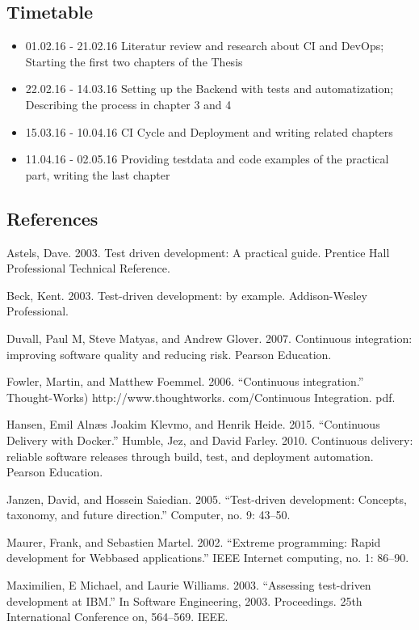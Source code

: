\subsection{Timetable}
\begin{itemize}
  \item 01.02.16 - 21.02.16 Literatur review and research about CI and DevOps; Starting the first two chapters of the Thesis
  \item 22.02.16 - 14.03.16 Setting up the Backend with tests and automatization; Describing the process in chapter 3 and 4
  \item 15.03.16 - 10.04.16 CI Cycle and Deployment and writing related chapters
  \item 11.04.16 - 02.05.16 Providing testdata and code examples of the practical part, writing the last chapter
\end{itemize}

\subsection{References}

Astels, Dave. 2003. Test driven development: A practical guide. Prentice Hall Professional Technical Reference.

Beck, Kent. 2003. Test-driven development: by example. Addison-Wesley Professional.

Duvall, Paul M, Steve Matyas, and Andrew Glover. 2007. Continuous integration: improving software quality and reducing risk. Pearson Education.

Fowler, Martin, and Matthew Foemmel. 2006. “Continuous integration.” Thought-Works) http://www.thoughtworks. com/Continuous Integration. pdf.

Hansen, Emil Alnæs Joakim Klevmo, and Henrik Heide. 2015. “Continuous Delivery with Docker.” Humble, Jez, and David Farley. 2010. Continuous delivery: reliable software releases through build, test, and deployment automation. Pearson Education.

Janzen, David, and Hossein Saiedian. 2005. “Test-driven development: Concepts, taxonomy, and future direction.” Computer, no. 9: 43–50.

Maurer, Frank, and Sebastien Martel. 2002. “Extreme programming: Rapid development for Webbased applications.” IEEE Internet computing, no. 1: 86–90.

Maximilien, E Michael, and Laurie Williams. 2003. “Assessing test-driven development at IBM.” In Software Engineering, 2003. Proceedings. 25th International Conference on, 564–569. IEEE.

